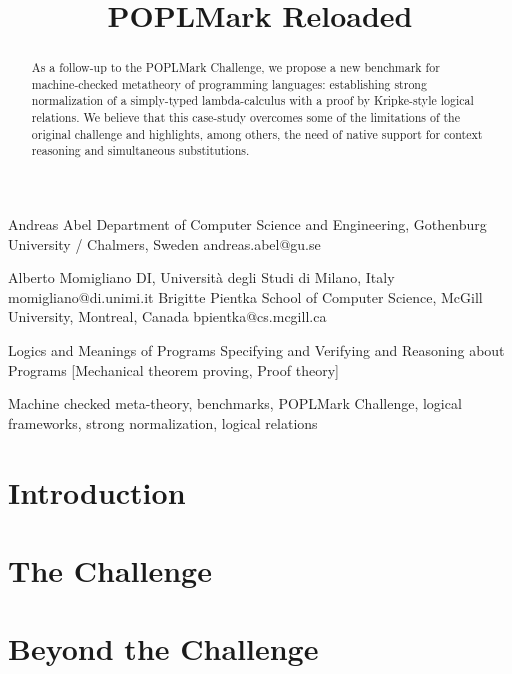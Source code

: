 \documentclass[preprint]{sigplanconf}
\begin{document}
\conferenceinfo{}{}
\CopyrightYear{}
\copyrightdata{}

\title{POPLMark Reloaded}
\authorinfo
 {Andreas Abel}
 {Department of Computer Science and Engineering, Gothenburg University / Chalmers, Sweden}
 {andreas.abel@gu.se}

 \authorinfo
 {Alberto Momigliano}
 {DI, Universit\`a degli Studi di Milano, Italy }{momigliano@di.unimi.it}
\authorinfo
 {Brigitte Pientka}
 {School of Computer Science, McGill University, Montreal,
           Canada}
 {bpientka@cs.mcgill.ca}
\maketitle

\begin{abstract}
  As a follow-up to the POPLMark Challenge, we propose a new benchmark
  for machine-checked metatheory of programming languages:
  establishing strong normalization of a simply-typed lambda-calculus
  with a proof by Kripke-style logical relations. We believe that this
  case-study overcomes some of the limitations of the original
  challenge and highlights, among others, the need of native support
  for context reasoning and simultaneous substitutions.
\end{abstract}


         {Logics and Meanings of Programs}
         {Specifying and Verifying and Reasoning about Programs}
[Mechanical theorem proving, Proof theory]



\keywords
Machine checked meta-theory,
benchmarks,
POPLMark Challenge,
logical frameworks,
strong normalization,
logical relations


\section{Introduction}
\label{sec:intro}

\section{The Challenge}
\label{sec:chal}


\section{Beyond the Challenge}
\label{sec:beyond}





\end{document}

